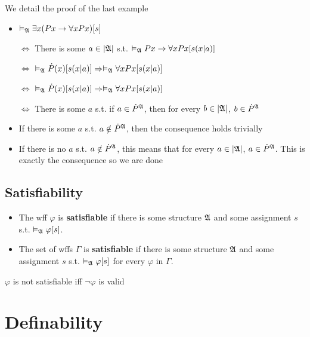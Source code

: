 We detail the proof of the last example

\begin{itemize}
    \item $\vDash_{\mathfrak{A}}\exists x (Px\to\forall x Px)[s]$
    \item[$\Leftrightarrow$] There is some $a \in |\mathfrak{A}|$ s.t. $\vDash_{\mathfrak{A}}Px \to \forall x Px[s(x|a)]$
    \item[$\Leftrightarrow$] $\vDash_{\mathfrak{A}}\dot{P}(x)[s(x|a)] \Rightarrow \vDash_{\mathfrak{A}}\forall x Px[s(x|a)]$
    \item[$\Leftrightarrow$] $\vDash_{\mathfrak{A}}\dot{P}(x)[s(x|a)] \Rightarrow \vDash_{\mathfrak{A}}\forall x Px[s(x|a)]$
    \item[$\Leftrightarrow$] There is some $a$ s.t. if $a \in \dot{P}^{\mathfrak{A}}$, then for every $b \in |\mathfrak{A}|$, $b\in\dot{P}^{\mathfrak{A}}$
    \item If there is some $a$ s.t. $a \notin \dot{P}^{\mathfrak{A}}$, then the consequence holds trivially
    \item If there is no $a$ s.t. $a \notin \dot{P}^{\mathfrak{A}}$, this means that for every $a \in |\mathfrak{A}|$, $a\in\dot{P}^{\mathfrak{A}}$. This is exactly the consequence so we are done
\end{itemize}

\subsection{Satisfiability}

\begin{definition}[Satisfiability]
    \begin{itemize}
        \item The wff $\varphi$ is \textbf{satisfiable} if there is some structure $\mathfrak{A}$ and some assignment $s$ s.t. $\vDash_{\mathfrak{A}}\varphi[s]$.
        \item The set of wffs $\Gamma$ is \textbf{satisfiable} if there is some structure $\mathfrak{A}$ and some assignment $s$ s.t. $\vDash_{\mathfrak{A}}\varphi[s]$ for every $\varphi$ in $\Gamma$.
    \end{itemize}
\end{definition}

\begin{theorem}
    $\varphi$ is not satisfiable iff $\neg\varphi$ is valid
\end{theorem}

\section{Definability}

